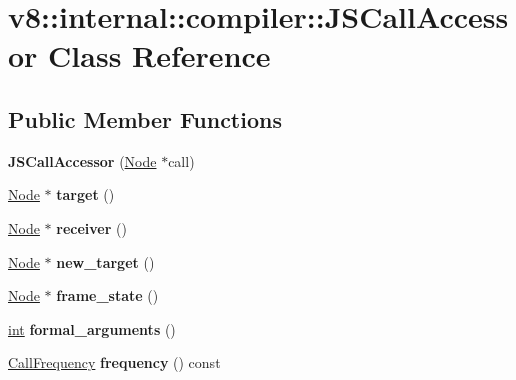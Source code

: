 \hypertarget{classv8_1_1internal_1_1compiler_1_1JSCallAccessor}{}\section{v8\+:\+:internal\+:\+:compiler\+:\+:J\+S\+Call\+Accessor Class Reference}
\label{classv8_1_1internal_1_1compiler_1_1JSCallAccessor}
\subsection*{Public Member Functions}
\begin{DoxyCompactItemize}
\item 
\mbox{\label{classv8_1_1internal_1_1compiler_1_1JSCallAccessor_a60a7212fe7310a623816fd8285b7c780}} 
{\bfseries J\+S\+Call\+Accessor} (\mbox{\hyperlink{classv8_1_1internal_1_1compiler_1_1Node}{Node}} $\ast$call)
\item 
\mbox{\label{classv8_1_1internal_1_1compiler_1_1JSCallAccessor_a49e33970dc77680761282f1ceee2316d}} 
\mbox{\hyperlink{classv8_1_1internal_1_1compiler_1_1Node}{Node}} $\ast$ {\bfseries target} ()
\item 
\mbox{\label{classv8_1_1internal_1_1compiler_1_1JSCallAccessor_ad5f9791f00bfda413b7e6711f1ff606c}} 
\mbox{\hyperlink{classv8_1_1internal_1_1compiler_1_1Node}{Node}} $\ast$ {\bfseries receiver} ()
\item 
\mbox{\label{classv8_1_1internal_1_1compiler_1_1JSCallAccessor_a5ba16d79b70af5056a40984a1c18b075}} 
\mbox{\hyperlink{classv8_1_1internal_1_1compiler_1_1Node}{Node}} $\ast$ {\bfseries new\+\_\+target} ()
\item 
\mbox{\label{classv8_1_1internal_1_1compiler_1_1JSCallAccessor_a03f190fd2f7e2a05c42569dd5541d75d}} 
\mbox{\hyperlink{classv8_1_1internal_1_1compiler_1_1Node}{Node}} $\ast$ {\bfseries frame\+\_\+state} ()
\item 
\mbox{\label{classv8_1_1internal_1_1compiler_1_1JSCallAccessor_a7eec6e7653ece423110154a10ae10d32}} 
\mbox{\hyperlink{classint}{int}} {\bfseries formal\+\_\+arguments} ()
\item 
\mbox{\label{classv8_1_1internal_1_1compiler_1_1JSCallAccessor_a53f2f5750ebde143b7a0d162e33a9c32}} 
\mbox{\hyperlink{classv8_1_1internal_1_1compiler_1_1CallFrequency}{Call\+Frequency}} {\bfseries frequency} () const
\end{DoxyCompactItemize}


